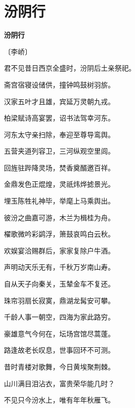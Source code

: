 \documentclass[12pt,UTF-8,openany,fontset=none]{ctexbook}
\begin{document}
\vspace{8pt}
\clearpage

\section{汾阴行}


\begin{center}
    {\bfseries 汾阴行}

    \vspace{18pt}

    \begin{large}\xuwen
        〔李峤〕
    \end{large}

\end{center}

    \vspace{18pt}  %

\begin{center}
    \begin{Large}

        君不见昔日西京全盛时，汾阴后土亲祭祀。\hspace{40pt}

        斋宫宿寝设储供，撞钟鸣鼓树羽旂。

        汉家五叶才且雄，宾延万灵朝九戎。

        柏梁赋诗高宴罢，诏书法驾幸河东。

        河东太守亲扫除，奉迎至尊导鸾舆。

        五营夹道列容卫，三河纵观空里闾。

        回旌驻跸降灵场，焚香奠醑邀百祥。

        金鼎发色正焜煌，灵祇炜烨摅景光。

        埋玉陈牲礼神毕，举麾上马乘舆出。

        彼汾之曲嘉可游，木兰为楫桂为舟。

        櫂歌微吟彩鹢浮，箫鼓哀鸣白云秋。

        欢娱宴洽赐群后，家家复除户牛酒。

        声明动天乐无有，千秋万岁南山寿。

        自从天子向秦关，玉辇金车不复还。

        珠帘羽扇长寂寞，鼎湖龙髯安可攀。

        千龄人事一朝空，四海为家此路穷。

        豪雄意气今何在，坛场宫馆尽蒿蓬。

        路逢故老长叹息，世事回环不可测。

        昔时青楼对歌舞，今日黄埃聚荆棘。

        山川满目泪沾衣，富贵荣华能几时？

        不见只今汾水上，唯有年年秋雁飞。

    \end{Large}

\end{center}
\end{document}
